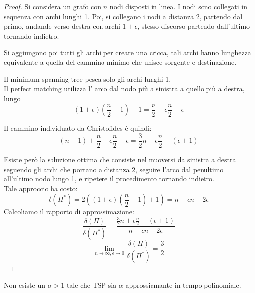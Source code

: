 \begin{proof}
    Si considera un grafo con $n$ nodi disposti in linea.
    I nodi sono collegati in sequenza con archi lunghi 1.
    Poi, si collegano i nodi a distanza 2, partendo dal primo, 
    andando verso destra con archi $1 + \epsilon$, stesso discorso partendo dall'ultimo tornando 
    indietro.

    Si aggiungono poi tutti gli archi per creare una cricca, tali archi hanno lunghezza
    equivalente a quella del cammino minimo che unisce sorgente e destinazione. 

    Il minimum spanning tree pesca solo gli archi lunghi 1.\\
    Il perfect matching utilizza l' arco dal nodo più a sinistra a quello più a destra, 
    lungo $$(1+\epsilon)(\frac{n}{2} -1 ) + 1 = \frac{n}{2} + \epsilon \frac{n}{2} - \epsilon$$

    Il cammino individuato da Christofides è quindi:
    $$(n-1) + \frac{n}{2} + \epsilon \frac{n}{2} - \epsilon = \frac{3}{2}n +\epsilon \frac{n}{2} - (\epsilon +1)$$

    Esiste però la soluzione ottima che consiste nel muoversi da sinistra a destra seguendo gli archi che portano 
    a distanza 2, seguire l'arco dal penultimo all'ultimo nodo lungo 1, e ripetere il procedimento 
    tornando indietro.\\
    Tale approccio ha costo: 
    $$\delta(\Pi^*) = 2((1+\epsilon)(\frac{n}{2}-1) +1) = n + \epsilon n -2\epsilon$$
    Calcoliamo il rapporto di approssimazione:
    $$\frac{\delta(\Pi)}{\delta(\Pi^*)} = \frac{\frac{3}{2}n +\epsilon \frac{n}{2} - (\epsilon +1)}{n + \epsilon n -2\epsilon}$$
    $$\lim_{n \rightarrow \infty, \epsilon \rightarrow 0}\frac{\delta(\Pi)}{\delta(\Pi^*)} = \frac{3}{2}$$
\end{proof}
\begin{theorem}
    Non esiste un $\alpha > 1$ tale che TSP sia $\alpha$-approssiamante in tempo polinomiale.
\end{theorem}

